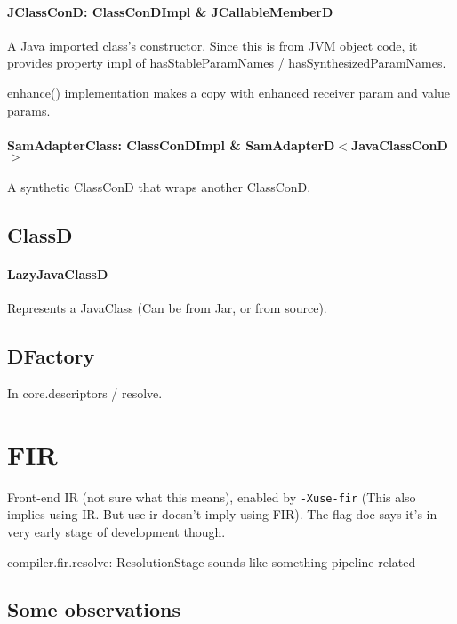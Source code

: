 \documentclass{article}
\begin{document}
\paragraph{JClassConD: ClassConDImpl \& JCallableMemberD}
A Java imported class's constructor. Since this is from JVM object code, it provides property impl of hasStableParamNames / hasSynthesizedParamNames.

enhance() implementation makes a copy with enhanced receiver param and value params.

\paragraph{SamAdapterClass: ClassConDImpl \& SamAdapterD$<$JavaClassConD$>$}
A synthetic ClassConD that wraps another ClassConD.

\subsection{ClassD}

\paragraph{LazyJavaClassD} Represents a JavaClass (Can be from Jar, or from source).

\subsection{DFactory}

In core.descriptors / resolve.

\section{FIR}
\label{sec:fir}

Front-end IR (not sure what this means), enabled by \texttt{-Xuse-fir} (This also implies using IR. But use-ir doesn't imply using FIR). The flag doc says it's in very early stage of development though.

compiler.fir.resolve: ResolutionStage sounds like something pipeline-related

\subsection{Some observations}
\end{document}
